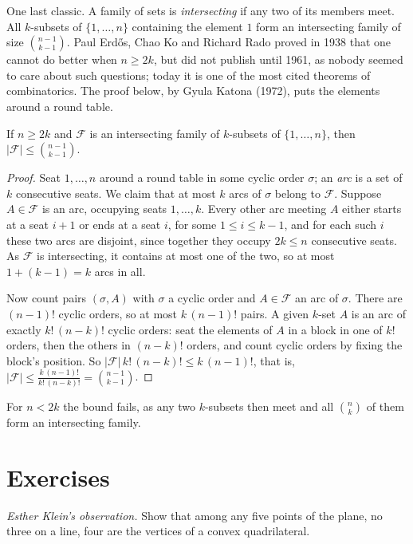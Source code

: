 One last classic. A family of sets is \emph{intersecting} if any two of its members meet. All $k$-subsets of $\{1,\dots,n\}$ containing
the element $1$ form an intersecting family of size $\binom{n-1}{k-1}$. Paul Erd\H os, Chao Ko and Richard Rado proved in 1938 that one
cannot do better when $n\ge2k$, but did not publish until 1961, as nobody seemed to care about such questions; today it is
one of the most cited theorems of combinatorics. The proof below, by Gyula Katona (1972), puts the elements around a
round table.

\begin{theorem}\label{thm:ekr}
If $n\ge2k$ and $\mathcal F$ is an intersecting family of $k$-subsets of $\{1,\dots,n\}$, then $|\mathcal F|\le\binom{n-1}{k-1}$.
\end{theorem}
\begin{proof}
Seat $1,\dots,n$ around a round table in some cyclic order $\sigma$; an \emph{arc} is a set of $k$ consecutive seats. We claim that at most $k$ arcs
of $\sigma$ belong to $\mathcal F$. Suppose $A\in\mathcal F$ is an arc, occupying seats $1,\dots,k$. Every other arc meeting $A$ either starts at a seat
$i+1$ or ends at a seat $i$, for some $1\le i\le k-1$, and for each such $i$ these two arcs are disjoint, since together they occupy
$2k\le n$ consecutive seats. As $\mathcal F$ is intersecting, it contains at most one of the two, so at most $1+(k-1)=k$ arcs in all.

Now count pairs $(\sigma,A)$ with $\sigma$ a cyclic order and $A\in\mathcal F$ an arc of $\sigma$. There are $(n-1)!$ cyclic orders, so at most $k\,(n-1)!$ pairs.
A given $k$-set $A$ is an arc of exactly $k!\,(n-k)!$ cyclic orders: seat the elements of $A$ in a block in one of $k!$ orders, then the
others in $(n-k)!$ orders, and count cyclic orders by fixing the block's position. So $|\mathcal F|\,k!\,(n-k)!\le k\,(n-1)!$, that is,
$|\mathcal F|\le\frac{k\,(n-1)!}{k!\,(n-k)!}=\binom{n-1}{k-1}$.
\end{proof}

For $n<2k$ the bound fails, as any two $k$-subsets then meet and all $\binom nk$ of them form an intersecting family.

\section{Exercises}

\begin{exercise}[$\star$]\label{ex:klein}
\emph{Esther Klein's observation.} Show that among any five points of the plane, no three on a line, four are the vertices of
a convex quadrilateral.
\end{exercise}

